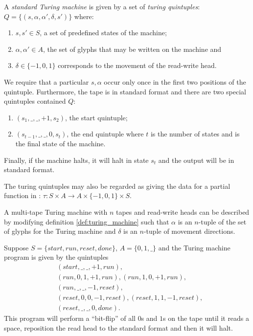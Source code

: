 \begin{definition}\label{def:turing_machine}
  A \emph{standard Turing machine} is given by a set of \emph{turing quintuples}:
  $Q=\{(s,\alpha,\alpha',\delta,s')\}$ where:
  \begin{enumerate}
    \item $s,s' \in S$, a set of predefined states of the machine;
    \item $\alpha, \alpha'\in A$, the set of glyphs that may be
      written on the machine and
    \item $\delta \in \{-1,0,1\}$ corresponds to the movement of the
    read-write head.
  \end{enumerate}
  We require that a particular $s,\alpha$ occur only
  once in the first two positions of the quintuple.
  Furthermore, the tape is in standard format and there are two special
  quintuples contained $Q$:
  \begin{enumerate}
    \item $(s_1,\_,\_,+1,s_2)$, the start quintuple;
    \item $(s_{t-1}, \_, \_, 0, s_{t})$, the end quintuple where
    $t$ is the number of states and is the final state of the machine.
  \end{enumerate}
  Finally, if the machine halts, it will halt in state $s_t$ and the output
  will be in standard format.
\end{definition}

The turing quintuples may also be regarded as giving the data for a partial
function in \sets: $\tau:S\times A \to A\times\{-1,0,1\}\times S$.
\begin{remark}
  A multi-tape Turing machine with $n$ tapes and read-write heads
  can be described by modifying
  definition \ref{def:turing_machine} such that $\alpha$ is an $n$-tuple
  of the set of glyphs for the Turing machine and $\delta$ is an
  $n$-tuple of movement directions.
\end{remark}

\begin{example}\label{exa:simple_turing_program}
  Suppose $S=\{start,run,reset,done\}$, $A=\{0,1,\_\}$ and the Turing machine
  program is given by the quintuples
  \begin{align*}
    &(start,\_,\_,+1,run),\\
    &(run,0,1,+1,run), (run,1,0,+1,run),\\
    &(run,\_,\_,-1,reset),\\
    &(reset,0,0,-1,reset),(reset,1,1,-1,reset),\\
    &(reset,\_,\_,0,done).
  \end{align*}
  This program will perform a ``bit-flip'' of all $0$s and $1$s on the tape
  until it reads a space, reposition the read head to the standard format
  and then it will halt.
\end{example}

